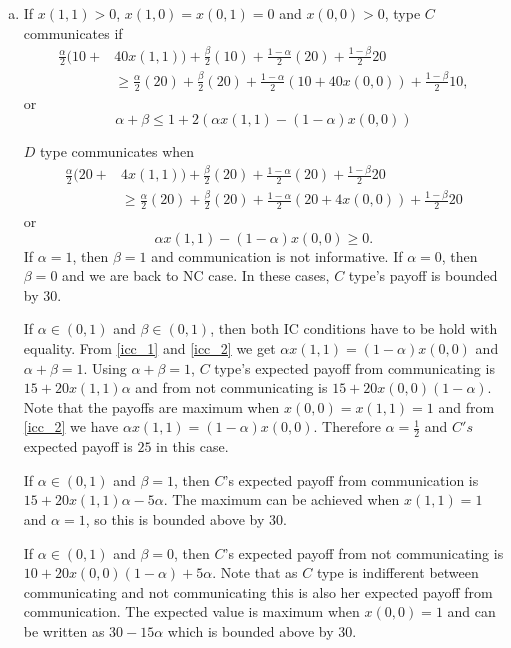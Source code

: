 \documentclass[12pt]{article}
\theoremstyle{break}
\begin{document}
\begin{enumerate}[(a)]
	\item If $x(1,1)>0$, $x(1,0)=x(0,1)=0$ and $x(0,0)>0$, type $C$ communicates if
	\begin{align*}
		\frac{\alpha}{2} (10+& 40x(1,1))+\frac{\beta}{2}(10)+\frac{1-\alpha}{2}(20)+\frac{1-\beta}{2}20\\ 
		&\geq \frac{\alpha}{2}(20) +\frac{\beta}{2}(20)+\frac{1-\alpha}{2}(10+40x(0,0))+\frac{1-\beta}{2}10,
	\end{align*}
	or
    \begin{equation}\label{icc_1}
    \alpha+\beta \leq 1+ 2 (\alpha x(1,1)-(1-\alpha)x(0,0))
    \end{equation}

    $D$ type communicates when
	\begin{align*}
		\frac{\alpha}{2} (20+& 4x(1,1))+\frac{\beta}{2}(20)+\frac{1-\alpha}{2}(20)+\frac{1-\beta}{2}20\\ 
		&\geq \frac{\alpha}{2}(20) +\frac{\beta}{2}(20)+\frac{1-\alpha}{2}(20+4x(0,0))+\frac{1-\beta}{2}20
	\end{align*}
	or
    \begin{equation}\label{icc_2}
    \alpha x(1,1)-(1-\alpha)x(0,0) \geq 0.
    \end{equation}
	If $\alpha=1$, then $\beta=1$ and communication is not informative. If $\alpha=0$, then $\beta=0$ and we are back to NC case. In these cases, $C$ type's payoff is bounded by $30$.
	
	If $\alpha\in(0,1)$ and $\beta \in (0,1)$, then both IC conditions have to be hold with equality. From \eqref{icc_1} and \eqref{icc_2} we get $\alpha x(1,1)=(1-\alpha) x(0,0)$ and $\alpha+\beta=1$. Using $\alpha+\beta=1$, $C$ type's expected payoff from communicating is $15 + 20 x(1,1) \alpha$ and from not communicating is $15+20 x(0,0) (1-\alpha)$. Note that the payoffs are maximum when $x(0,0)=x(1,1)=1$ and from \eqref{icc_2} we have $\alpha x(1,1)=(1-\alpha) x(0,0)$. Therefore $\alpha=\frac{1}{2}$ and $C's$ expected payoff is $25$ in this case.
	
	If $\alpha\in(0,1)$ and $\beta =1$, then $C$'s expected payoff from communication is $15+20x(1,1) \alpha - 5 \alpha$. The maximum can be achieved when $x(1,1)=1$ and $\alpha=1$, so this is bounded above by $30$.

	If $\alpha\in(0,1)$ and $\beta =0$, then $C$'s expected payoff from not communicating is $10+20x(0,0)(1-\alpha)+5\alpha$. Note that as $C$ type is indifferent between communicating and not communicating this is also her expected payoff from communication. The expected value is maximum when $x(0,0)=1$ and can be written as $30-15\alpha$ which is bounded above by $30$.	
	

\end{enumerate}
\end{document}
